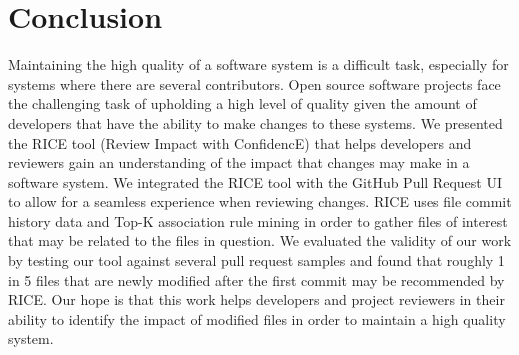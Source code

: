 
\section{Conclusion}
\label{sec:conclusion}

Maintaining the high quality of a software system is a difficult task, especially for systems where there are several contributors. Open source software projects face the challenging task of upholding a high level of quality given the amount of developers that have the ability to make changes to these systems. We presented the RICE tool (Review Impact with ConfidencE) that helps developers and reviewers gain an understanding of the impact that changes may make in a software system. We integrated the RICE tool with the GitHub Pull Request UI to allow for a seamless experience when reviewing changes. RICE uses file commit history data and Top-K association rule mining in order to gather files of interest that may be related to the files in question. We evaluated the validity of our work by testing our tool against several pull request samples and found that roughly 1 in 5 files that are newly modified after the first commit may be recommended by RICE. Our hope is that this work helps developers and project reviewers in their ability to identify the impact of modified files in order to maintain a high quality system.

